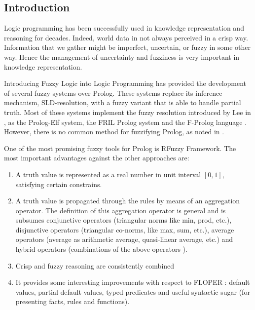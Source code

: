 \subsection{Introduction}
Logic programming \cite{Llo87} has been successfully used in knowledge representation and reasoning for decades. Indeed, world data in not always perceived in a crisp way. Information that we gather might be imperfect, uncertain, or fuzzy in some other way. Hence the management of uncertainty and fuzziness is very important in knowledge representation.

Introducing Fuzzy Logic into Logic Programming has provided the development of several fuzzy systems over Prolog. These systems replace its inference mechanism, SLD-resolution, with a fuzzy variant that is able to handle partial truth. Most of these systems implement the fuzzy resolution introduced by Lee in \cite{Lee72}, as the Prolog-Elf system, the FRIL Prolog system \cite{IK85} and the F-Prolog language \cite{LL90}. However, there is no common method for fuzzifying Prolog, as noted in \cite{SDM89}.

One of the most promising fuzzy tools for Prolog is RFuzzy Framework. The most important advantages against the other approaches are:
\begin{enumerate}
\item A truth value is represented as a real number in unit interval $[0,1]$, satisfying certain constrains. 
\item A truth value is propagated through the rules by means of an aggregation operator. The definition of this aggregation operator is general and is subsumes conjunctive operators (triangular norms \cite{KPMRPE00} like min, prod, etc.), disjunctive operators \cite{TCC95} (triangular co-norms, like max, sum, etc.),
average operators (average as arithmetic average, quasi-linear average, etc.) and hybrid operators (combinations of the above operators \cite{PTC02}). 
\item Crisp and fuzzy reasoning are consistently combined
\item It provides some interesting improvements with respect to FLOPER \cite{MM08a,Mor06}: default values, partial default values, typed predicates and useful syntactic sugar (for presenting facts, rules and functions).
\end{enumerate}